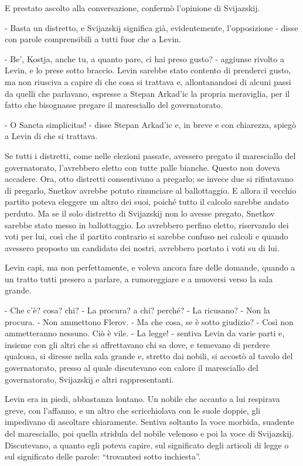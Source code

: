 E prestato ascolto alla conversazione, confermò l'opinione di Svijazskij. 

- Basta un distretto, e Svijazskij significa già, evidentemente, l'opposizione - disse con parole comprensibili a tutti fuor che a Levin. 

- Be', Kostja, anche tu, a quanto pare, ci hai preso gusto? - aggiunse rivolto a Levin, e lo prese sotto braccio. Levin sarebbe stato contento di prenderci gusto, ma non riusciva a capire di che cosa si trattava e, allontanandosi di alcuni passi da quelli che parlavano, espresse a Stepan Arkad'ic la propria meraviglia, per il fatto che bisognasse pregare il maresciallo del governatorato. 

- O Sancta simplicitas! - disse Stepan Arkad'ic e, in breve e con chiarezza, spiegò a Levin di che si trattava. 

Se tutti i distretti, come nelle elezioni passate, avessero pregato il maresciallo del governatorato, l'avrebbero eletto con tutte palle bianche. Questo non doveva accadere. Ora, otto distretti consentivano a pregarlo; se invece due si rifiutavano di pregarlo, Snetkov avrebbe potuto rinunciare al ballottaggio. E allora il vecchio partito poteva eleggere un altro dei suoi, poiché tutto il calcolo sarebbe andato perduto. Ma se il solo distretto di Svijazskij non lo avesse pregato, Snetkov sarebbe stato messo in ballottaggio. Lo avrebbero perfino eletto, riservando dei voti per lui, così che il partito contrario si sarebbe confuso nei calcoli e quando avessero proposto un candidato dei nostri, avrebbero portato i voti su di lui. 

Levin capì, ma non perfettamente, e voleva ancora fare delle domande, quando a un tratto tutti presero a parlare, a rumoreggiare e a muoversi verso la sala grande. 

- Che c'è? cosa? chi? - La procura? a chi? perché? - La ricusano? - Non la procura. - Non ammettono Flerov. - Ma che cosa, se è sotto giudizio? - Così non ammetteranno nessuno. Ciò è vile. - La legge! - sentiva Levin da varie parti e, insieme con gli altri che si affrettavano chi sa dove, e temevano di perdere qualcosa, si diresse nella sala grande e, stretto dai nobili, si accostò al tavolo del governatorato, presso al quale discutevano con calore il maresciallo del governatorato, Svijazskij e altri rappresentanti. 

Levin era in piedi, abbastanza lontano. Un nobile che accanto a lui respirava greve, con l'affanno, e un altro che scricchiolava con le suole doppie, gli impedivano di ascoltare chiaramente. Sentiva soltanto la voce morbida, suadente del maresciallo, poi quella stridula del nobile velenoso e poi la voce di Svijazskij. Discutevano, a quanto egli poteva capire, sul significato degli articoli di legge o sul significato delle parole: ``trovantesi sotto inchiesta''. 

